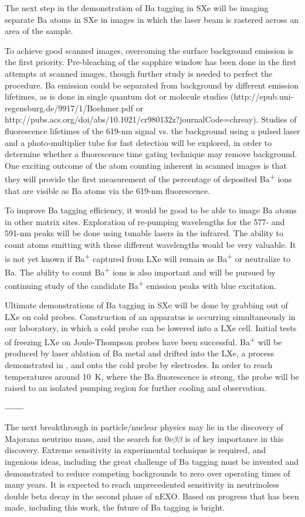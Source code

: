 The next step in the demonstration of Ba tagging in SXe will be imaging separate Ba atoms in SXe in images in which the laser beam is rastered across an area of the sample.  

To achieve good scanned images, overcoming the surface background emission is the first priority.  Pre-bleaching of the sapphire window has been done in the first attempts at scanned images, though further study is needed to perfect the procedure.  Ba emission could be separated from background by different emission lifetimes, as is done in single quantum dot or molecule studies (http://epub.uni-regensburg.de/9917/1/Boehmer.pdf or http://pubs.acs.org/doi/abs/10.1021/cr980132z?journalCode=chreay).  Studies of fluorescence lifetimes of the 619-nm signal vs. the background using a pulsed laser and a photo-multiplier tube for fast detection will be explored, in order to determine whether a fluorescence time gating technique may remove background.  One exciting outcome of the atom counting inherent in scanned images is that they will provide the first measurement of the percentage of deposited Ba\textsuperscript{+} ions that are visible as Ba atoms via the 619-nm fluorescence.

To improve Ba tagging efficiency, it would be good to be able to image Ba atoms in other matrix sites.  Exploration of re-pumping wavelengths for the 577- and 591-nm peaks will be done using tunable lasers in the infrared.  The ability to count atoms emitting with these different wavelengths would be very valuable.  It is not yet known if Ba\textsuperscript{+} captured from LXe will remain as Ba\textsuperscript{+} or neutralize to Ba.  The ability to count Ba\textsuperscript{+} ions is also important and will be pursued by continuing study of the candidate Ba\textsuperscript{+} emission peaks with blue excitation.

Ultimate demonstrations of Ba tagging in SXe will be done by grabbing out of LXe on cold probes.  Construction of an apparatus is occurring simultaneously in our laboratory, in which a cold probe can be lowered into a LXe cell.  Initial tests of freezing LXe on Joule-Thompson probes have been successful.  Ba\textsuperscript{+} will be produced by laser ablation of Ba metal and drifted into the LXe, a process demonstrated in \cite{Kendy}, and onto the cold probe by electrodes.  In order to reach temperatures around 10~K, where the Ba fluorescence is strong, the probe will be raised to an isolated pumping region for further cooling and observation.

\begin{center}
\textbf{------}
\end{center}

The next breakthrough in particle/nuclear physics may lie in the discovery of Majorana neutrino mass, and the search for $0\nu\beta\beta$ is of key importance in this discovery.  Extreme sensitivity in experimental technique is required, and ingenious ideas, including the great challenge of Ba tagging must be invented and demonstrated to reduce competing backgrounds to zero over operating times of many years.  It is expected to reach unprecedented sensitivity in neutrinoless double beta decay in the second phase of nEXO.  Based on progress that has been made, including this work, the future of Ba tagging is bright.
